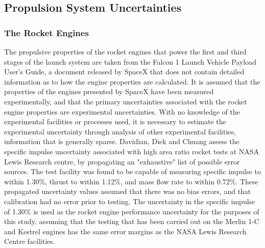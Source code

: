 




\subsection{Propulsion System Uncertainties}\label{sec:propunc}




\subsubsection{The Rocket Engines}
The propulsive properties of the rocket engines that power the first and third stages of the launch system are taken from the Falcon 1 Launch Vehicle Payload User's Guide\cite{Vehicle2008}, a document released by SpaceX that does not contain detailed information as to how the engine properties are calculated. It is assumed that the properties of the engines presented by SpaceX have been measured experimentally, and that the primary uncertainties associated with the rocket engine properties are experimental uncertainties. With no knowledge of the experimental facilities or processes used, it is necessary to estimate the experimental uncertainty through analysis of other experimental facilities, information that is generally sparse. Davidian, Diek and Chuang\cite{Davidian1987} assess the specific impulse uncertainty associated with high area ratio rocket tests at NASA Lewis Research centre, by propagating an "exhaustive" list of possible error sources. The test facility was found to be capable of measuring specific impulse to within 1.30\%, thrust to within 1.12\%, and mass flow rate to within 0.72\%. These propagated uncertainty values assumed that there was no bias errors, and that calibration had no error prior to testing. 
The uncertainty in the specific impulse of 1.30\% is used as the rocket engine performance uncertainty for the purposes of this study, assuming that the testing that has been carried out on the Merlin 1-C and Kestrel engines has the same error margins as the NASA Lewis Research Centre facilities. 

